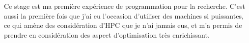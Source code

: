 \documentclass[11pts,french]{article}
\begin{document}
Ce stage est ma première expérience de programmation pour la recherche. C'est aussi la première fois que j'ai eu l'occasion d'utiliser des machines si puissantes, ce qui amène des considération d'HPC que je n'ai jamais eus, et m'a permis de prendre en considération des aspect d'optimisation très enrichissant.

\vfill


\end{document}
